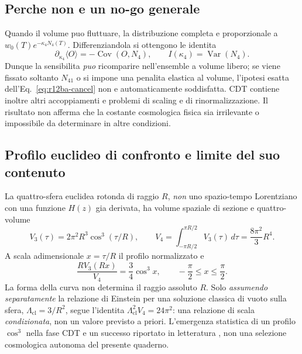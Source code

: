 \documentclass[11pt,a4paper]{article}
\begin{document}
\subsection{Perche non e un no-go generale}

Quando il volume puo fluttuare, la distribuzione completa e proporzionale a $w_0(T)e^{-\kappa_4N_4(T)}$. Differenziandola si ottengono le identita
\begin{equation}\label{eq:r12ba-grand}
 \boxed{\quad\partial_{\kappa_4}\langle O\rangle
 =-\operatorname{Cov}(O,N_4),\qquad
 I(\kappa_4)=\operatorname{Var}(N_4).\quad}
\end{equation}
Dunque la sensibilita \emph{puo} ricomparire nell'ensemble a volume libero; se viene fissato soltanto $N_{41}$ o si impone una penalita elastica al volume, l'ipotesi esatta dell'Eq.~\eqref{eq:r12ba-cancel} non e automaticamente soddisfatta. CDT contiene inoltre altri accoppiamenti e problemi di scaling e di rinormalizzazione. Il risultato non afferma che la costante cosmologica fisica sia irrilevante o impossibile da determinare in altre condizioni.

\subsection{Profilo euclideo di confronto e limite del suo contenuto}

La quattro-sfera euclidea rotonda di raggio $R$, \emph{non} uno spazio-tempo Lorentziano con una funzione $H(z)$ gia derivata, ha volume spaziale di sezione e quattro-volume
\begin{equation}\label{eq:r12ba-S4}
 V_3(\tau)=2\pi^2R^3\cos^3(\tau/R),\qquad
 V_4=\int_{-\pi R/2}^{\pi R/2}V_3(\tau)\,d\tau
 =\frac{8\pi^2}{3}R^4.
\end{equation}
A scala adimensionale $x=\tau/R$ il profilo normalizzato e
\begin{equation}\label{eq:r12ba-normalized}
 \frac{R V_3(Rx)}{V_4}=\frac34\cos^3 x,
 \qquad -\frac\pi2\le x\le\frac\pi2.
\end{equation}
La forma della curva non determina il raggio assoluto $R$. Solo \emph{assumendo separatamente} la relazione di Einstein per una soluzione classica di vuoto sulla sfera, $\Lambda_{\mathrm{cl}}=3/R^2$, segue l'identita $\Lambda_{\mathrm{cl}}^2V_4=24\pi^2$: una relazione di scala \emph{condizionata}, non un valore previsto a priori. L'emergenza statistica di un profilo $\cos^3$ nella fase CDT e un successo riportato in letteratura \cite{GlaserLoll2017CDT,AmbjornLoll2026CDT}, non una selezione cosmologica autonoma del presente quaderno.
\end{document}
